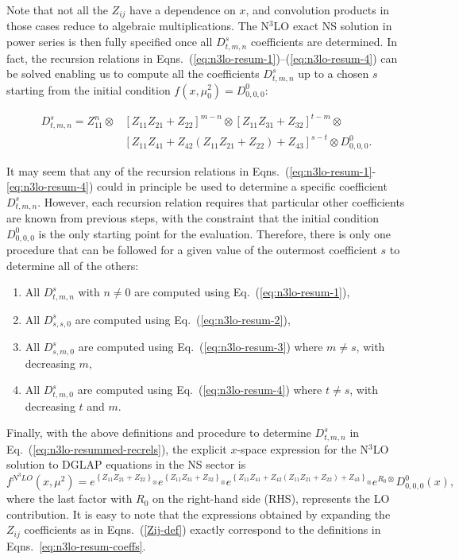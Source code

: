 \documentclass[12pt,notitlepage,aps,preprintnumbers,superscriptaddress,nofootinbib,aps,prd,floatfix]{revtex4-2}
\renewenvironment{eqnarray}{\begin{equation}\begin{aligned}}
{\end{aligned}\end{equation}}
\begin{document}
Note that not all the $Z_{ij}$ have a dependence on $x$, and convolution products in those cases reduce to algebraic multiplications.
The N$^3$LO exact NS solution in power series is then fully specified once all $D^{s}_{t,m,n}$ coefficients are determined. In fact, the recursion relations 
in Eqns.~(\ref{eq:n3lo-resum-1})--(\ref{eq:n3lo-resum-4}) can be solved enabling us to compute all the coefficients $D^{s}_{t,m,n}$ up to a chosen $s$ starting from the initial condition $f(x,\mu_0^2) = D^{0}_{0,0,0}$:  

\begin{eqnarray}
D^s_{t,m,n} = Z_{11}^n\otimes  
&\left[ Z_{11} Z_{21} + Z_{22} \right]^{m-n}\otimes \left[ Z_{11} Z_{31} + Z_{32} \right]^{t-m} \otimes
\\
&\left[ Z_{11} Z_{41} + Z_{42} (Z_{11} Z_{21} + Z_{22}) + Z_{43} \right]^{s-t}\otimes D^0_{0,0,0}.
\label{eq:n3lo-resummed-recrels}
\end{eqnarray}

It may seem that any of the recursion relations in Eqns.~(\ref{eq:n3lo-resum-1}-\ref{eq:n3lo-resum-4}) could in principle be used to determine a specific coefficient $D^{s}_{t,m,n}$. However, each recursion relation requires that particular other coefficients are known from previous steps, with the constraint that the initial condition $D^{0}_{0,0,0}$ is the only starting point for the evaluation. Therefore, there is only one procedure that can be followed for a given value of the outermost coefficient $s$ to determine all of the others:

\begin{enumerate}
\item All $D^s_{t,m,n}$ with $n\neq0$ are computed using Eq.~(\ref{eq:n3lo-resum-1}),
\item All $D^s_{s,s,0}$ are computed using Eq.~(\ref{eq:n3lo-resum-2}),
\item All $D^s_{s,m,0}$ are computed using Eq.~(\ref{eq:n3lo-resum-3}) where $m \neq s$, with decreasing $m$,
\item All $D^s_{t,m,0}$ are computed using Eq.~(\ref{eq:n3lo-resum-4}) where $t \neq s$, with decreasing $t$ and $m$.
\newline
\end{enumerate}

Finally, with the above definitions and procedure to determine $D^s_{t,m,n}$ in Eq.~(\ref{eq:n3lo-resummed-recrels}), the explicit $x$-space expression for the N$^3$LO solution to DGLAP equations in the NS sector is 
%
\begin{equation}
f^{N^3LO}(x,\mu^2) =  e^{\left\{  Z_{11} Z_{21} + Z_{22}\right\}_\otimes} e^{\left\{  Z_{11} Z_{31} + Z_{32}\right\}_\otimes} 
e^{\left\{Z_{11} Z_{41} + Z_{42} (Z_{11} Z_{21} + Z_{22}) + Z_{43}   \right\}_\otimes}
e^{R_0\otimes} D^0_{0,0,0}(x),
\label{n3lo-NSsolution}
\end{equation}
%
where the last factor with $R_0$ on the right-hand side (RHS), represents the LO contribution. It is easy to note that the expressions obtained by expanding the $Z_{ij}$ coefficients as in Eqns.~(\ref{Zij-def}) exactly correspond to the definitions in Eqns.~\eqref{eq:n3lo-resum-coeffs}. 
\end{document}
